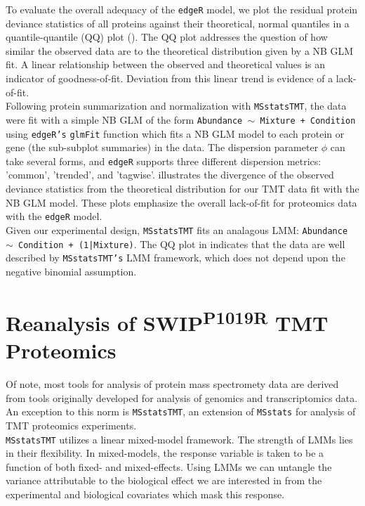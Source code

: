 \documentclass[11pt]{elife}\usepackage[]{graphicx}\usepackage[]{color}
\begin{document}
To evaluate the overall adequacy of the \texttt{edgeR} model, we plot the 
residual protein deviance statistics of all proteins against their theoretical, 
normal quantiles in a quantile-quantile (QQ) plot ().
The QQ plot addresses the question of how similar the observed data are to the
theoretical distribution given by a NB GLM fit. A linear relationship between the
observed and theoretical values is an indicator of goodness-of-fit.
Deviation from this linear trend is evidence of a lack-of-fit.\\

Following protein summarization and normalization with \texttt{MSstatsTMT}, the
data were fit with a simple NB GLM of the form \texttt{Abundance $\sim$ Mixture
+ Condition} using \texttt{edgeR's} \texttt{glmFit} function which fits a NB GLM
model to each protein or gene (the sub-subplot summaries) in the data. The
dispersion parameter $\phi$ can take several forms, and \texttt{edgeR} supports
three different dispersion metrics: 'common', 'trended', and 'tagwise'.
 illustrates the divergence of the observed deviance
statistics from the theoretical distribution for our TMT data fit with the NB
GLM model.  These plots emphasize the overall lack-of-fit for proteomics data
with the \texttt{edgeR} model.\\ 

Given our experimental design, \texttt{MSstatsTMT} fits an analagous LMM:
\texttt{Abundance $\sim$ Condition + (1|Mixture)}. 
The QQ plot in  indicates that the data are well 
described by \texttt{MSstatsTMT's} LMM framework, which 
does not depend upon the negative binomial assumption.


\section{Reanalysis of SWIP\textsuperscript{P1019R} TMT Proteomics}

Of note, most tools for analysis of protein mass spectromety data are derived
from tools originally developed for analysis of genomics and transcriptomics
data. An exception to this norm is \texttt{MSstatsTMT}, an extension of 
\texttt{MSstats} for analysis of TMT proteomics experiments.\\

\texttt{MSstatsTMT} utilizes a linear mixed-model framework. The strength of
LMMs lies in their flexibility. In mixed-models, the response variable is 
taken to be a function of both fixed- and mixed-effects. Using LMMs we can 
untangle the variance attributable to the biological effect we
are interested in from the experimental and biological covariates
which mask this response.\\
\end{document}
